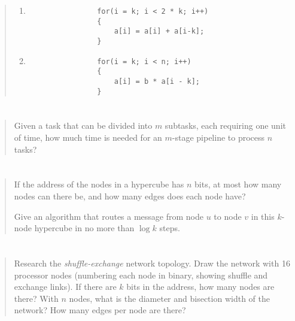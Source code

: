\documentclass{article}
\begin{document}
\begin{quote}
\begin{enumerate}
            \item \begin{verbatim}
                for(i = k; i < 2 * k; i++)
                {
                    a[i] = a[i] + a[i-k];
                }
            \end{verbatim}

            \item \begin{verbatim}
                for(i = k; i < n; i++)
                {
                    a[i] = b * a[i - k];
                }
            \end{verbatim}
        \end{enumerate}
    \end{quote}

\section{}
    \begin{quote}
        Given a task that can be divided into $m$ subtasks, each requiring one unit of time, how much time is needed for an $m$-stage pipeline to process $n$ tasks?
    \end{quote}

\section{}
    \begin{quote}
        If the address of the nodes in a hypercube has $n$ bits, at most how many nodes can there be, and how many edges does each node have?

        Give an algorithm that routes a message from node $u$ to node $v$ in this $k$-node hypercube in no more than $\log k$ steps.
    \end{quote}

\section{}
    \begin{quote}
        Research the \textit{shuffle-exchange} network topology. Draw the network with 16 processor nodes (numbering each node in binary, showing shuffle and exchange links). If there are $k$ bits in the address, how many nodes are there? With $n$ nodes, what is the diameter and bisection width of the network? How many edges per node are there?
    \end{quote}
\end{document}
